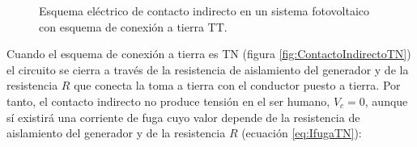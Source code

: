 %
\begin{figure}
\hfill{}\hfill{}\hfill{}

\caption{Esquema eléctrico de contacto indirecto en un sistema fotovoltaico
con esquema de conexión a tierra TT.\label{fig:ContactoIndirectoTT}}

\end{figure}


Cuando el esquema de conexión a tierra es TN (figura \ref{fig:ContactoIndirectoTN})
el circuito se cierra a través de la resistencia de aislamiento del
generador y de la resistencia $R$ que conecta la toma a tierra con
el conductor puesto a tierra. Por tanto, el contacto indirecto no
produce tensión en el ser humano, $V_{c}=0$, aunque sí existirá una
corriente de fuga cuyo valor depende de la resistencia de aislamiento
del generador y de la resistencia $R$ (ecuación \ref{eq:IfugaTN}):

